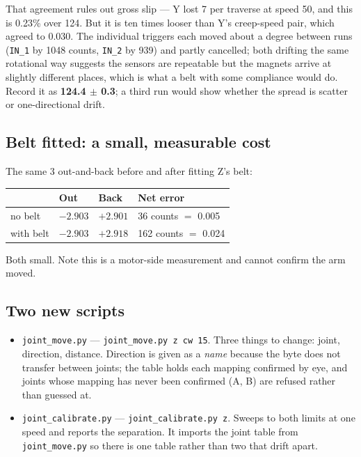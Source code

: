 \documentclass[11pt,letterpaper]{article}
\begin{document}
That agreement rules out gross slip --- Y lost 7\textdegree{} per traverse at
speed 50, and this is 0.23\% over 124\textdegree{}. But it is ten times looser
than Y's creep-speed pair, which agreed to 0.030\textdegree{}. The individual
triggers each moved about a degree between runs (\texttt{IN\_1} by 1048 counts,
\texttt{IN\_2} by 939) and partly cancelled; both drifting the same rotational
way suggests the sensors are repeatable but the magnets arrive at slightly
different places, which is what a belt with some compliance would do. Record it
as \textbf{124.4\textdegree{} $\pm$ 0.3\textdegree{}}; a third run would show
whether the spread is scatter or one-directional drift.

\subsection{Belt fitted: a small, measurable cost}
The same 3\textdegree{} out-and-back before and after fitting Z's belt:

\begin{center}
\begin{tabular}{llll}
\toprule
 & \textbf{Out} & \textbf{Back} & \textbf{Net error} \\ \midrule
no belt   & $-2.903$\textdegree{} & $+2.901$\textdegree{} & 36 counts $=$ 0.005\textdegree{} \\
with belt & $-2.903$\textdegree{} & $+2.918$\textdegree{} & 162 counts $=$ 0.024\textdegree{} \\
\bottomrule
\end{tabular}
\end{center}

Both small. Note this is a motor-side measurement and cannot confirm the arm
moved.

\subsection{Two new scripts}
\begin{itemize}
    \item \texttt{joint\_move.py} --- \texttt{joint\_move.py z cw 15}. Three
    things to change: joint, direction, distance. Direction is given as a
    \emph{name} because the byte does not transfer between joints; the table
    holds each mapping confirmed by eye, and joints whose mapping has never been
    confirmed (A, B) are refused rather than guessed at.
    \item \texttt{joint\_calibrate.py} --- \texttt{joint\_calibrate.py z}. Sweeps
    to both limits at one speed and reports the separation. It imports the joint
    table from \texttt{joint\_move.py} so there is one table rather than two that
    drift apart.
\end{itemize}
\end{document}
